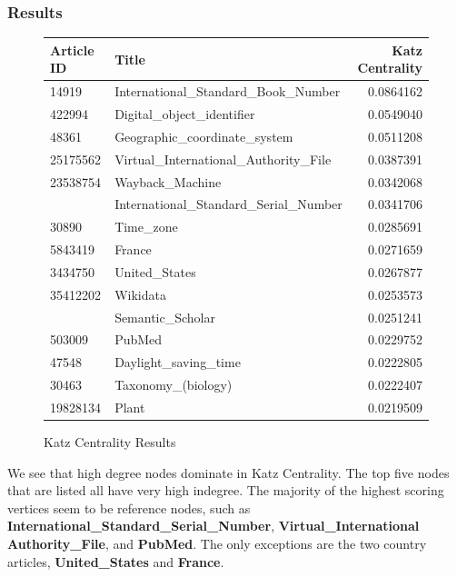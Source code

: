 \documentclass{article}
\begin{document}
\subsubsection{Results}
\begin{figure}[H]
    \centering
    \caption{Katz Centrality Results}
    \begin{tabular}{llr}
        \toprule
        Article ID & Title & Katz Centrality\\
        \midrule
        14919 & International\_Standard\_Book\_Number & 0.0864162\\
        422994 & Digital\_object\_identifier & 0.0549040\\
        48361 & Geographic\_coordinate\_system & 0.0511208\\
        25175562 & Virtual\_International\_Authority\_File & 0.0387391\\
    23538754 & Wayback\_Machine & 0.0342068\\
    \addlinespace
    234930 & International\_Standard\_Serial\_Number & 0.0341706\\
    30890 & Time\_zone & 0.0285691\\
    5843419 & France & 0.0271659\\
    3434750 & United\_States & 0.0267877\\
    35412202 & Wikidata & 0.0253573\\
    \addlinespace
    48455863 & Semantic\_Scholar & 0.0251241\\
    503009 & PubMed & 0.0229752\\
    47548 & Daylight\_saving\_time & 0.0222805\\
    30463 & Taxonomy\_(biology) & 0.0222407\\
    19828134 & Plant & 0.0219509\\
    \bottomrule
    \end{tabular}
\end{figure}

We see that high degree nodes dominate in Katz Centrality.
The top five nodes that are listed all have very high indegree.
The majority of the highest scoring vertices seem to be reference nodes, such as \textbf{International\_Standard\_Serial\_Number}, \textbf{Virtual\_International Authority\_File}, and \textbf{PubMed}.
The only exceptions are the two country articles, \textbf{United\_States} and \textbf{France}.

\end{document}
